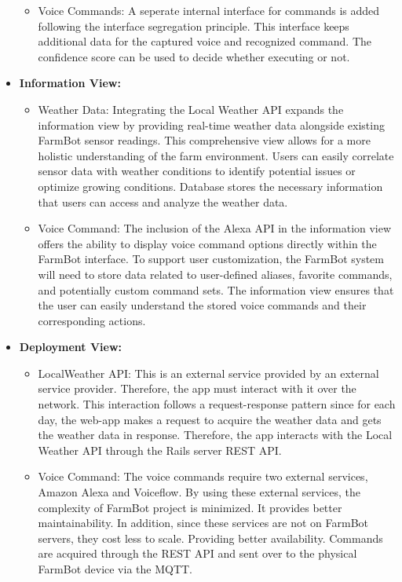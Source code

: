 \begin{itemize}
\begin{itemize}
        \item Voice Commands: A seperate internal interface for commands is added following the interface segregation principle. This interface keeps additional data for the captured voice and recognized command. The confidence score can be used to decide whether executing or not.
    \end{itemize}
    \item \textbf{Information View:}
          \begin{itemize}
              \item Weather Data: Integrating the Local Weather API expands the information view by providing real-time weather data alongside existing FarmBot sensor readings. This comprehensive view allows for a more holistic understanding of the farm environment. Users can easily correlate sensor data with weather conditions to identify potential issues or optimize growing conditions. Database stores the necessary information that users can access and analyze the weather data.
              \item Voice Command: The inclusion of the Alexa API in the information view offers the ability to display voice command options directly within the FarmBot interface. To support user customization, the FarmBot system will need to store data related to user-defined aliases, favorite commands, and potentially custom command sets. The information view ensures that the user can easily understand the stored voice commands and their corresponding actions.
          \end{itemize}
    \item \textbf{Deployment View:} \begin{itemize}
        \item LocalWeather API: This is an external service provided by an external service provider. Therefore, the app must interact with it over the network. This interaction follows a request-response pattern since for each day, the web-app makes a request to acquire the weather data and gets the weather data in response. Therefore, the app interacts with the Local Weather API through the Rails server REST API.
        \item Voice Command: The voice commands require two external services, Amazon Alexa and Voiceflow. By using these external services, the complexity of FarmBot project is minimized. It provides better maintainability. In addition, since these services are not on FarmBot servers, they cost less to scale. Providing better availability. Commands are acquired through the REST API and sent over to the physical FarmBot device via the MQTT.
    \end{itemize}
\end{itemize}